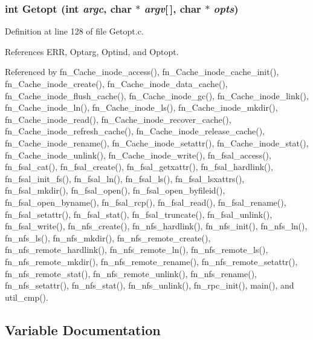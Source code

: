 \subsubsection{\setlength{\rightskip}{0pt plus 5cm}int Getopt (int {\em argc}, char $\ast$ {\em argv}[$\,$], char $\ast$ {\em opts})}\label{Getopt_8c_a7}




Definition at line 128 of file Getopt.c.

References ERR, Optarg, Optind, and Optopt.

Referenced by fn\_\-Cache\_\-inode\_\-access(), fn\_\-Cache\_\-inode\_\-cache\_\-init(), fn\_\-Cache\_\-inode\_\-create(), fn\_\-Cache\_\-inode\_\-data\_\-cache(), fn\_\-Cache\_\-inode\_\-flush\_\-cache(), fn\_\-Cache\_\-inode\_\-gc(), fn\_\-Cache\_\-inode\_\-link(), fn\_\-Cache\_\-inode\_\-ln(), fn\_\-Cache\_\-inode\_\-ls(), fn\_\-Cache\_\-inode\_\-mkdir(), fn\_\-Cache\_\-inode\_\-read(), fn\_\-Cache\_\-inode\_\-recover\_\-cache(), fn\_\-Cache\_\-inode\_\-refresh\_\-cache(), fn\_\-Cache\_\-inode\_\-release\_\-cache(), fn\_\-Cache\_\-inode\_\-rename(), fn\_\-Cache\_\-inode\_\-setattr(), fn\_\-Cache\_\-inode\_\-stat(), fn\_\-Cache\_\-inode\_\-unlink(), fn\_\-Cache\_\-inode\_\-write(), fn\_\-fsal\_\-access(), fn\_\-fsal\_\-cat(), fn\_\-fsal\_\-create(), fn\_\-fsal\_\-getxattr(), fn\_\-fsal\_\-hardlink(), fn\_\-fsal\_\-init\_\-fs(), fn\_\-fsal\_\-ln(), fn\_\-fsal\_\-ls(), fn\_\-fsal\_\-lsxattrs(), fn\_\-fsal\_\-mkdir(), fn\_\-fsal\_\-open(), fn\_\-fsal\_\-open\_\-byfileid(), fn\_\-fsal\_\-open\_\-byname(), fn\_\-fsal\_\-rcp(), fn\_\-fsal\_\-read(), fn\_\-fsal\_\-rename(), fn\_\-fsal\_\-setattr(), fn\_\-fsal\_\-stat(), fn\_\-fsal\_\-truncate(), fn\_\-fsal\_\-unlink(), fn\_\-fsal\_\-write(), fn\_\-nfs\_\-create(), fn\_\-nfs\_\-hardlink(), fn\_\-nfs\_\-init(), fn\_\-nfs\_\-ln(), fn\_\-nfs\_\-ls(), fn\_\-nfs\_\-mkdir(), fn\_\-nfs\_\-remote\_\-create(), fn\_\-nfs\_\-remote\_\-hardlink(), fn\_\-nfs\_\-remote\_\-ln(), fn\_\-nfs\_\-remote\_\-ls(), fn\_\-nfs\_\-remote\_\-mkdir(), fn\_\-nfs\_\-remote\_\-rename(), fn\_\-nfs\_\-remote\_\-setattr(), fn\_\-nfs\_\-remote\_\-stat(), fn\_\-nfs\_\-remote\_\-unlink(), fn\_\-nfs\_\-rename(), fn\_\-nfs\_\-setattr(), fn\_\-nfs\_\-stat(), fn\_\-nfs\_\-unlink(), fn\_\-rpc\_\-init(), main(), and util\_\-cmp().

\subsection{Variable Documentation}
